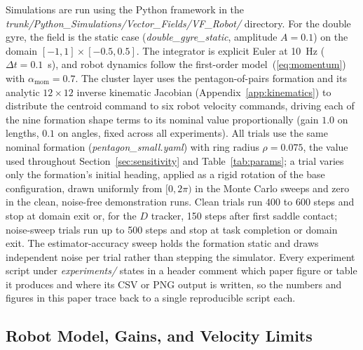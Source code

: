 \documentclass[lettersize,journal]{IEEEtran}
\begin{document}
Simulations are run using the Python framework in the
\textit{trunk/Python\_Simulations/Vector\_Fields/VF\_Robot/} directory.
For the double gyre, the field is the static case
(\textit{double\_gyre\_static}, amplitude $A = 0.1$) on the domain
$[-1, 1] \times [-0.5, 0.5]$. The integrator is explicit Euler at
10~Hz ($\Delta t = 0.1$~s), and robot dynamics follow the first-order
model~(\ref{eq:momentum}) with $\alpha_{\text{mom}} = 0.7$. The cluster layer uses
the pentagon-of-pairs formation and its analytic $12 \times 12$ inverse
kinematic Jacobian (Appendix~\ref{app:kinematics}) to distribute the
centroid command to six robot velocity commands, driving each of the
nine formation shape terms to its nominal value proportionally (gain
$1.0$ on lengths, $0.1$ on angles, fixed across all experiments). All
trials use the same nominal formation (\textit{pentagon\_small.yaml})
with ring radius $\rho = 0.075$, the value used throughout
Section~\ref{sec:sensitivity} and Table~\ref{tab:params}; a trial
varies only the formation's initial heading, applied as a rigid
rotation of the base configuration, drawn uniformly from $[0, 2\pi)$ in
the Monte Carlo sweeps and zero in the clean, noise-free demonstration
runs. Clean trials run 400 to 600 steps and stop at domain exit or, for
the $D$ tracker, 150 steps after first saddle contact; noise-sweep
trials run up to 500 steps and stop at task completion or domain exit.
The estimator-accuracy sweep holds the formation static and draws
independent noise per trial rather than stepping the simulator. Every
experiment script under \textit{experiments/} states in a header
comment which paper figure or table it produces and where its CSV or
PNG output is written, so the numbers and figures in this paper trace
back to a single reproducible script each.

\subsection{Robot Model, Gains, and Velocity Limits}
\label{sec:robot_model}
\end{document}
